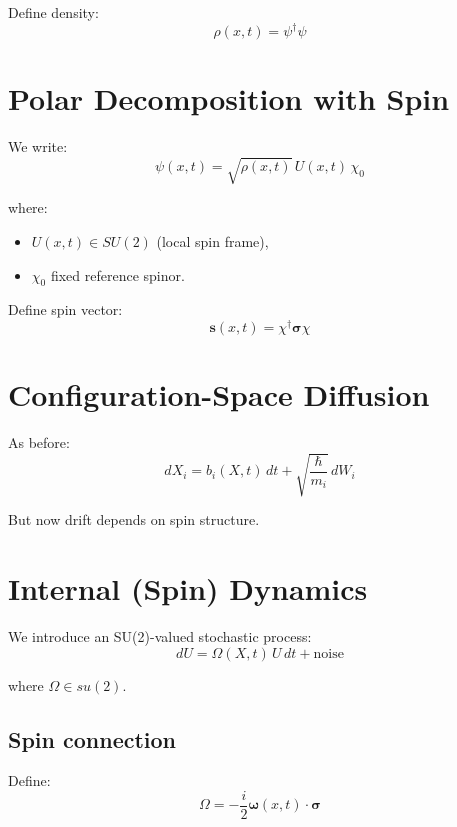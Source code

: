 \documentclass[11pt]{article}
\begin{document}
Define density:
\begin{equation}
\rho(x,t) = \psi^\dagger \psi
\end{equation}

\section{Polar Decomposition with Spin}

We write:
\begin{equation}
\psi(x,t) = \sqrt{\rho(x,t)}\, U(x,t)\,\chi_0
\end{equation}

where:
\begin{itemize}
\item $U(x,t) \in SU(2)$ (local spin frame),
\item $\chi_0$ fixed reference spinor.
\end{itemize}

Define spin vector:
\begin{equation}
\mathbf{s}(x,t) = \chi^\dagger \bm{\sigma} \chi
\end{equation}

\section{Configuration-Space Diffusion}

As before:
\begin{equation}
dX_i = b_i(X,t)\,dt + \sqrt{\frac{\hbar}{m_i}}\, dW_i
\end{equation}

But now drift depends on spin structure.

\section{Internal (Spin) Dynamics}

We introduce an SU(2)-valued stochastic process:
\begin{equation}
dU = \Omega(X,t)\,U\,dt + \text{noise}
\end{equation}

where $\Omega \in su(2)$.

\subsection{Spin connection}

Define:
\begin{equation}
\Omega = -\frac{i}{2} \bm{\omega}(x,t)\cdot \bm{\sigma}
\end{equation}
\end{document}
